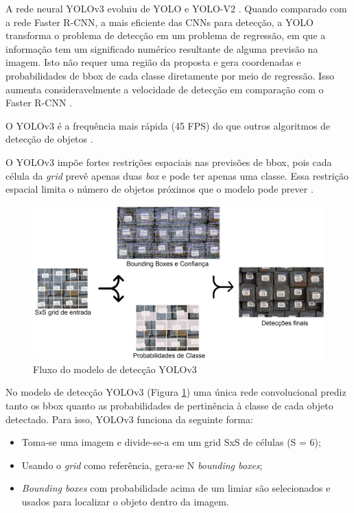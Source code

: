A rede neural YOLOv3 evoluiu de YOLO e YOLO-V2 \cite{redmon2018yolov3}. Quando comparado com a rede Faster R-CNN, a mais eficiente das CNNs para detecção, a YOLO transforma o problema de detecção em um problema de regressão, em que a informação tem um significado numérico resultante de alguma previsão na imagem. Isto não requer uma região da proposta e gera coordenadas e probabilidades de bbox de cada classe diretamente por meio de regressão. Isso aumenta consideravelmente a velocidade de detecção em comparação com o Faster R-CNN \cite{yolov3_apple}.

O YOLOv3 é a frequência mais rápida (45 FPS) do que outros algoritmos de detecção de objetos \cite{yolov3RealTime}.

O YOLOv3 impõe fortes restrições espaciais nas previsões de bbox, pois cada célula da \textit{grid} prevê apenas duas \textit{box} e pode ter apenas uma classe. Essa restrição espacial limita o número de objetos próximos que o modelo pode prever \cite{yolov3RealTime}.

\begin{figure}[H]
		\centering
		\includegraphics[scale=0.2]{figuras/MachineLearning/yolo.png}
		\caption{Fluxo do modelo de detecção YOLOv3}
		\label{fig:yolo}
\end{figure}

No modelo de detecção YOLOv3 (Figura \ref{fig:yolo}) uma única rede convolucional prediz tanto os bbox quanto as probabilidades de pertinência à classe de cada objeto detectado. Para isso, YOLOv3 funciona da seguinte forma:

\begin{itemize}
    \item Toma-se uma imagem e divide-se-a em um grid SxS de células (S = 6);
    \item Usando o \textit{grid} como referência, gera-se N \textit{bounding boxes};
    \item \textit{Bounding boxes} com probabilidade acima de um limiar são selecionados e usados para localizar o objeto dentro da imagem.
\end{itemize}


